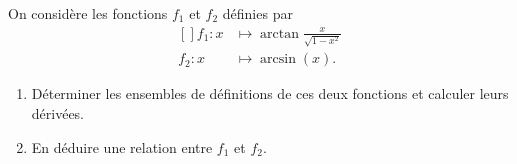 
\begin{exercice}\label{exoTD4-0003}

	On considère les fonctions $f_1$ et $f_2$ définies par
	\begin{equation}
		\begin{aligned}[]
			f_1\colon x&\mapsto \arctan\frac{ x }{ \sqrt{1-x^2} }\\
			f_2\colon x&\mapsto \arcsin(x).
		\end{aligned}
	\end{equation}
	\begin{enumerate}
		\item
			Déterminer les ensembles de définitions de ces deux fonctions et calculer leurs dérivées.
		\item
			En déduire une relation entre $f_1$ et $f_2$.
	\end{enumerate}

\end{exercice}
